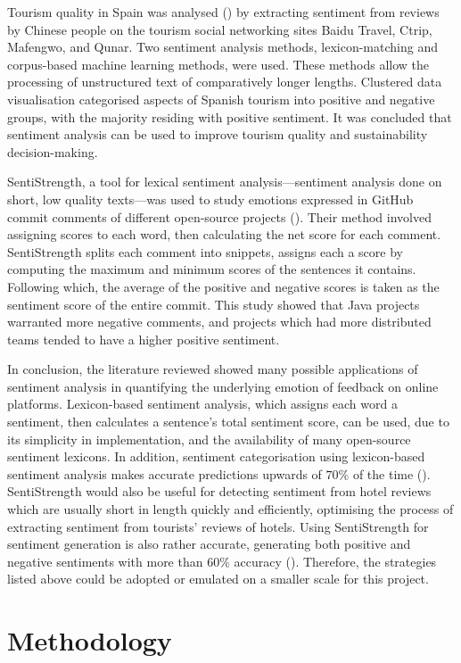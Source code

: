 \documentclass[12pt,bibliography=totocnumbered]{scrartcl}
\begin{document}
{%
Tourism quality in Spain was analysed (\cite{spain}) by
extracting sentiment from reviews by Chinese people on the tourism
social networking sites Baidu Travel, Ctrip, Mafengwo, and Qunar.
Two sentiment analysis methods, lexicon-matching and corpus-based machine
learning methods, were used. These methods allow the processing of
unstructured text of comparatively longer lengths. Clustered data
visualisation categorised aspects of Spanish tourism into positive
and negative groups, with the majority residing with positive sentiment.
It was concluded that sentiment analysis can be used to improve tourism
quality and sustainability decision-making.

SentiStrength, a tool for lexical sentiment analysis---sentiment analysis done
on short, low quality texts---was used to study emotions expressed in GitHub
commit comments of different open-source projects (\cite{github}).
Their method involved assigning scores to each word, then calculating the net
score for each comment. SentiStrength splits each comment into snippets, assigns
each a score by computing the maximum and minimum scores of the sentences it contains.
Following which, the average of the positive and negative scores is taken as the
sentiment score of the entire commit. This study showed that Java projects warranted
more negative comments, and projects which had more distributed teams tended
to have a higher positive sentiment.

In conclusion, the literature reviewed showed many possible applications
of sentiment analysis in quantifying the underlying emotion of feedback
on online platforms. Lexicon-based sentiment analysis, which assigns each
word a sentiment, then calculates a sentence's total sentiment score, can
be used, due to its simplicity in implementation, and the availability of
many open-source sentiment lexicons. In addition, sentiment categorisation
using lexicon-based sentiment analysis makes accurate predictions upwards of
$70\%$ of the time (\cite{khoo}). SentiStrength would also be useful for
detecting sentiment from hotel reviews which are usually short in length quickly
and efficiently, optimising the process of extracting sentiment from tourists'
reviews of hotels. Using SentiStrength for sentiment generation is also
rather accurate, generating both positive and negative sentiments with more
than $60\%$ accuracy (\cite{thelwall}). Therefore, the strategies listed %
above could be adopted or emulated on a smaller scale for this project.

\section{Methodology}

}
\end{document}
